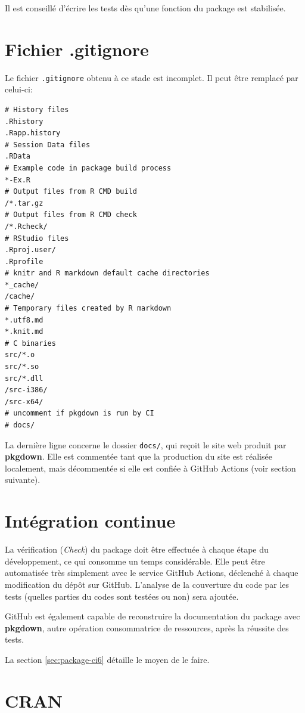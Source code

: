 \documentclass[
  12pt,
  french,
  a4paper,
  extrafontsizes,onecolumn,openright
  ]{memoir}
\begin{document}
Il est conseillé d'écrire les tests dès qu'une fonction du package est stabilisée.

\section{Fichier .gitignore}\label{fichier-.gitignore}

Le fichier \texttt{.gitignore} obtenu à ce stade est incomplet.
Il peut être remplacé par celui-ci:

\begin{verbatim}
# History files
.Rhistory
.Rapp.history
# Session Data files
.RData
# Example code in package build process
*-Ex.R
# Output files from R CMD build
/*.tar.gz
# Output files from R CMD check
/*.Rcheck/
# RStudio files
.Rproj.user/
.Rprofile
# knitr and R markdown default cache directories
*_cache/
/cache/
# Temporary files created by R markdown
*.utf8.md
*.knit.md
# C binaries
src/*.o
src/*.so
src/*.dll
/src-i386/
/src-x64/
# uncomment if pkgdown is run by CI
# docs/
\end{verbatim}

La dernière ligne concerne le dossier \texttt{docs/}, qui reçoit le site web produit par \textbf{pkgdown}.
Elle est commentée tant que la production du site est réalisée localement, mais décommentée si elle est confiée à GitHub Actions (voir section suivante).

\section{Intégration continue}\label{sec:package-ci5}

La vérification (\emph{Check}) du package doit être effectuée à chaque étape du développement, ce qui consomme un temps considérable.
Elle peut être automatisée très simplement avec le service GitHub Actions, déclenché à chaque modification du dépôt sur GitHub.
L'analyse de la couverture du code par les tests (quelles parties du codes sont testées ou non) sera ajoutée.

GitHub est également capable de reconstruire la documentation du package avec \textbf{pkgdown}, autre opération consommatrice de ressources, après la réussite des tests.

La section \ref{sec:package-ci6} détaille le moyen de le faire.

\section{CRAN}\label{sec:package-cran}
\end{document}
